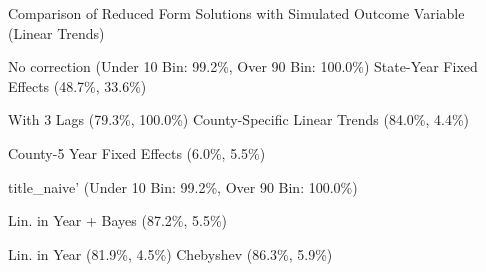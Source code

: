 \caption{Comparison of Reduced Form Solutions with Simulated Outcome Variable (Linear Trends) \label{fig:distributions-existing-solutions}}
\caption*{\color{p1line}{\textbf{\textemdash\textemdash}} No correction (Under 10 Bin: 99.2\%, Over 90 Bin: 100.0\%) \hspace{1cm} \color{p2line}{- - -} State-Year Fixed Effects (48.7\%, 33.6\%)}
\caption*{\color{p3line}{\textbf{- - -}} With 3 Lags (79.3\%, 100.0\%) \hspace{1cm} \color{p4line}{\textbf{- - -}} County-Specific Linear Trends (84.0\%, 4.4\%)}
\caption*{\color{p5line}{\textbf{- - -}} County-5 Year Fixed Effects (6.0\%, 5.5\%)}


\caption*{\color{p1line}{\textbf{\textemdash\textemdash}} title_naive' (Under 10 Bin: 99.2\%, Over 90 Bin: 100.0\%)}
\caption*{\color{p2line}{\textbf{- - -}} Lin. in Year + Bayes (87.2\%, 5.5\%)}
\caption*{\color{p3line}{\textbf{- - -}} Lin. in Year (81.9\%, 4.5\%) \hspace{1cm} \color{p4line}{\textbf{- - -}} Chebyshev (86.3\%, 5.9\%)}